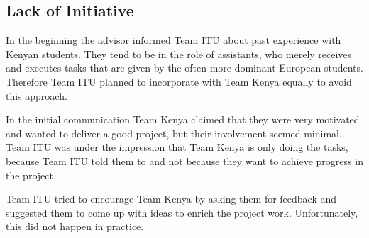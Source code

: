 
\subsection{Lack of Initiative}
\label{sec:initiative_lack}

In the beginning the advisor informed Team ITU about past experience with Kenyan students. They tend to be in the role of assistants, who merely receives and executes tasks that are given by the often more dominant European students. Therefore Team ITU planned to incorporate with Team Kenya equally to avoid this approach.

In the initial communication Team Kenya claimed that they were very motivated and wanted to deliver a good project, but their involvement seemed minimal. Team ITU was under the impression that Team Kenya is only doing the tasks, because Team ITU told them to and not because they want to achieve progress in the project.

Team ITU tried to encourage Team Kenya by asking them for feedback and suggested them to come up with ideas to enrich the project work. Unfortunately, this did not happen in practice.




